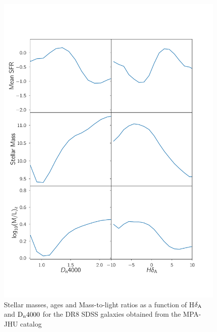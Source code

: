 

\begin{figure}
\includegraphics[width=\textwidth]{figures/mass_age_sfr_dist.pdf}
\caption[SFR's, stellar masses, ages and Mass-to-light ratios as a function of H$\delta_{\rm A}$ and ${\rm D}_{\rm n}4000$ for the DR8 SDSS galaxies
obtained from the MPA-JHU catalog]
{Stellar masses, ages and Mass-to-light ratios as a function of H$\delta_{\rm A}$ and ${\rm D}_{\rm n}4000$ for the DR8 SDSS galaxies obtained from the MPA-JHU catalog
\label{fig:sfr_mass}}
\end{figure}


